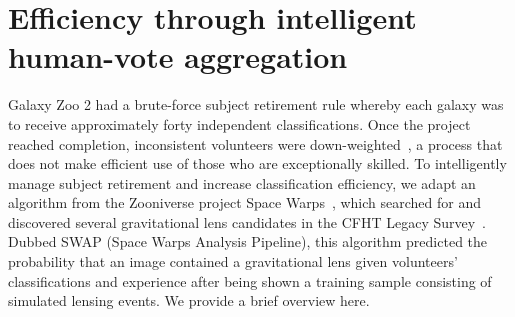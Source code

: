 \documentclass[twocolumn]{aastex6}
\begin{document}

\section{Efficiency through intelligent human-vote aggregation}\label{sec: SWAP}

Galaxy Zoo 2 had a brute-force subject retirement rule whereby each galaxy 
was to receive approximately forty independent classifications. 
Once the project reached completion, inconsistent volunteers were down-weighted~\citep{Willett2013}, 
a process that does not make efficient use of those who are exceptionally skilled. 
To intelligently manage subject retirement and increase classification efficiency, 
we adapt an algorithm from the Zooniverse project Space Warps~\citep{Marshall2016}, 
which searched for and discovered several gravitational lens candidates in the 
CFHT Legacy Survey~\citep{More2016}.  
Dubbed SWAP (Space Warps Analysis Pipeline),  this algorithm predicted the 
probability that an image contained a gravitational lens given 
volunteers' classifications and experience after being shown a training
sample consisting of simulated lensing events.  We provide a brief overview here.  
\end{document}
